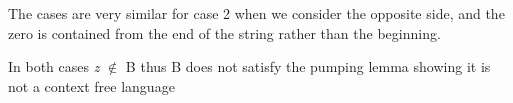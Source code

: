 \documentclass[12pt]{report}
\newcounter{casenum}
\newenvironment{caseof}{\setcounter{casenum}{1}}{\vskip.5\baselineskip}
\newcommand{\case}[2]{\vskip.5\baselineskip\par\noindent {\bfseries Case \arabic{casenum}:} #1\\#2\addtocounter{casenum}{1}}
\begin{document}
\begin{flushleft}
\begin{addmargin}[1cm]{0em}
	\end{addmargin}
	\pagebreak
	The cases are very similar for case 2 when we consider the opposite side, and the zero is contained from the end of the string rather than the beginning.\newline
	
	In both cases \textit{z} $\notin$ B thus B does not satisfy the pumping lemma showing it is not a context free language \\
\end{flushleft}
\end{document}

